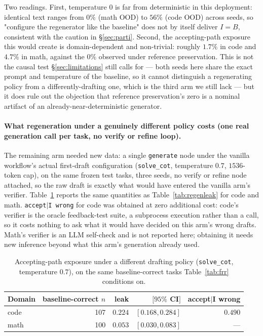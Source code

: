 \documentclass{article}
\begin{document}
Two readings. First, temperature $0$ is far from deterministic in this
deployment: identical text ranges from $0\%$ (math OOD) to $56\%$ (code OOD)
across seeds, so "configure the regenerator like the baseline" does not by
itself deliver $I=B$, consistent with the caution in
\S\ref{sec:parti}. Second, the accepting-path exposure this would create is
domain-dependent and non-trivial: roughly $1.7\%$ in code and $4.7\%$ in math,
against the $0\%$ observed under reference preservation. This is not the causal
test \S\ref{sec:limitations} still calls for --- both seeds here share the exact
prompt and temperature of the baseline, so it cannot distinguish a regenerating
policy from a differently-drafting one, which is the third arm we still lack
--- but it does rule out the objection that reference preservation's zero is a
nominal artifact of an already-near-deterministic generator.

\paragraph{What regeneration under a genuinely different policy costs (one real
generation call per task, no verify or refine loop).} The remaining arm needed
new data: a single \texttt{generate} node under the vanilla workflow's actual
first-draft configuration (\texttt{solve\_cot}, temperature $0.7$,
$1536$-token cap), on the same frozen test tasks, three seeds, no verify or
refine node attached, so the raw draft is exactly what would have entered the
vanilla arm's verifier. Table~\ref{tab:armc} reports the same quantities as
Table~\ref{tab:regenleak} for code and math. \texttt{accept$\mid$I wrong} for
code was obtained at zero additional cost: code's verifier is the oracle
feedback-test suite, a subprocess execution rather than a call, so it costs
nothing to ask what it would have decided on this arm's wrong drafts. Math's
verifier is an LLM self-check and is not reported here; obtaining it needs new
inference beyond what this arm's generation already used.

\begin{table}[h]
\centering
\small
\caption{Accepting-path exposure under a different drafting policy
(\texttt{solve\_cot}, temperature $0.7$), on the same baseline-correct tasks
Table~\ref{tab:frr} conditions on.}
\label{tab:armc}
\begin{tabular}{lrrrr}
\toprule
Domain & baseline-correct $n$ & leak & $[95\%$ CI$]$ & accept$\mid$I wrong \\
\midrule
code & 107 & $0.224$ & $[0.168, 0.284]$ & $0.490$ \\
math & 100 & $0.053$ & $[0.030, 0.083]$ & --- \\
\bottomrule
\end{tabular}
\end{table}
\end{document}
